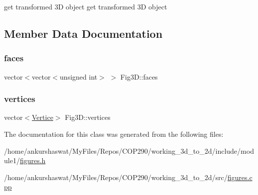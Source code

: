 get transformed 3D object get transformed 3D object 

\subsection{Member Data Documentation}
\mbox{\label{classFig3D_abd9f97ce3404190fd202b12885d56fe3}} 
\subsubsection{\texorpdfstring{faces}{faces}}
{\footnotesize\ttfamily vector$<$vector$<$unsigned int$>$ $>$ Fig3\+D\+::faces}

\mbox{\label{classFig3D_a3d00aa545805c0c04563055cc183cbb9}} 
\subsubsection{\texorpdfstring{vertices}{vertices}}
{\footnotesize\ttfamily vector$<$\hyperlink{structVertice}{Vertice}$>$ Fig3\+D\+::vertices}



The documentation for this class was generated from the following files\+:\begin{DoxyCompactItemize}
\item 
/home/ankurshaswat/\+My\+Files/\+Repos/\+C\+O\+P290/working\+\_\+3d\+\_\+to\+\_\+2d/include/module1/\hyperlink{figures_8h}{figures.\+h}\item 
/home/ankurshaswat/\+My\+Files/\+Repos/\+C\+O\+P290/working\+\_\+3d\+\_\+to\+\_\+2d/src/\hyperlink{figures_8cpp}{figures.\+cpp}\end{DoxyCompactItemize}
